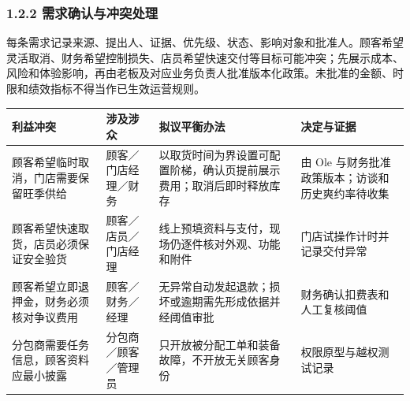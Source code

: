 \subsubsection{1.2.2 需求确认与冲突处理}

每条需求记录来源、提出人、证据、优先级、状态、影响对象和批准人。顾客希望灵活取消、财务希望控制损失、店员希望快速交付等目标可能冲突；先展示成本、风险和体验影响，再由老板及对应业务负责人批准版本化政策。未批准的金额、时限和绩效指标不得当作已生效运营规则。

{\def\LTcaptype{none} %
\begin{longtable}[]{@{}
  >{\centering\arraybackslash}p{}
  >{\raggedright\arraybackslash}p{}
  >{\raggedright\arraybackslash}p{}
  >{\raggedright\arraybackslash}p{}@{}}
\toprule\noalign{}\rowcolor{TableHead}
\begin{minipage}[b]{\linewidth}\color{white}\bfseries\centering
\textbf{利益冲突}
\end{minipage} & \begin{minipage}[b]{\linewidth}\color{white}\bfseries\centering
\textbf{涉及涉众}
\end{minipage} & \begin{minipage}[b]{\linewidth}\color{white}\bfseries\centering
\textbf{拟议平衡办法}
\end{minipage} & \begin{minipage}[b]{\linewidth}\color{white}\bfseries\centering
\textbf{决定与证据}
\end{minipage} \\
\midrule\noalign{}
\endhead
\bottomrule\noalign{}
\endlastfoot
顾客希望临时取消，门店需要保留旺季供给 & 顾客／门店经理／财务 & 以取货时间为界设置可配置阶梯，确认页提前展示费用；取消后即时释放库存 & 由 Ole 与财务批准政策版本；访谈和历史爽约率待收集 \\
顾客希望快速取货，店员必须保证安全验货 & 顾客／店员／门店经理 & 线上预填资料与支付，现场仍逐件核对外观、功能和附件 & 门店试操作计时并记录交付异常 \\
顾客希望立即退押金，财务必须核对争议费用 & 顾客／财务／经理 & 无异常自动发起退款；损坏或逾期需先形成依据并经阈值审批 & 财务确认扣费表和人工复核阈值 \\
分包商需要任务信息，顾客资料应最小披露 & 分包商／顾客／管理员 & 只开放被分配工单和装备故障，不开放无关顾客身份 & 权限原型与越权测试记录 \\
\end{longtable}
}

